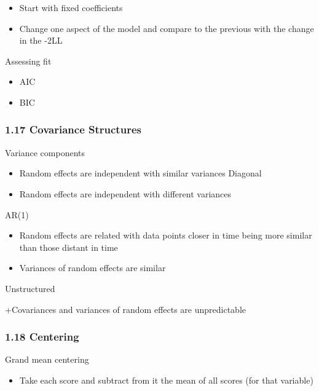 \documentclass[
]{article}
\providecommand{\tightlist}{%
  \setlength{\itemsep}{0pt}\setlength{\parskip}{0pt}}
\begin{document}
\begin{itemize}
\tightlist
\item
  Start with fixed coefficients
\item
  Change one aspect of the model and compare to the previous with the
  change in the -2LL
\end{itemize}

Assessing fit

\begin{itemize}
\tightlist
\item
  AIC
\item
  BIC
\end{itemize}

\hypertarget{covariance-structures}{%
\subsubsection{1.17 Covariance Structures}\label{covariance-structures}}

Variance components

\begin{itemize}
\item
  Random effects are independent with similar variances Diagonal
\item
  Random effects are independent with different variances
\end{itemize}

AR(1)

\begin{itemize}
\tightlist
\item
  Random effects are related with data points closer in time being more
  similar than those distant in time
\item
  Variances of random effects are similar
\end{itemize}

Unstructured

+Covariances and variances of random effects are unpredictable

\hypertarget{centering}{%
\subsubsection{1.18 Centering}\label{centering}}

Grand mean centering

\begin{itemize}
\tightlist
\item
  Take each score and subtract from it the mean of all scores (for that
  variable)
\end{itemize}
\end{document}
